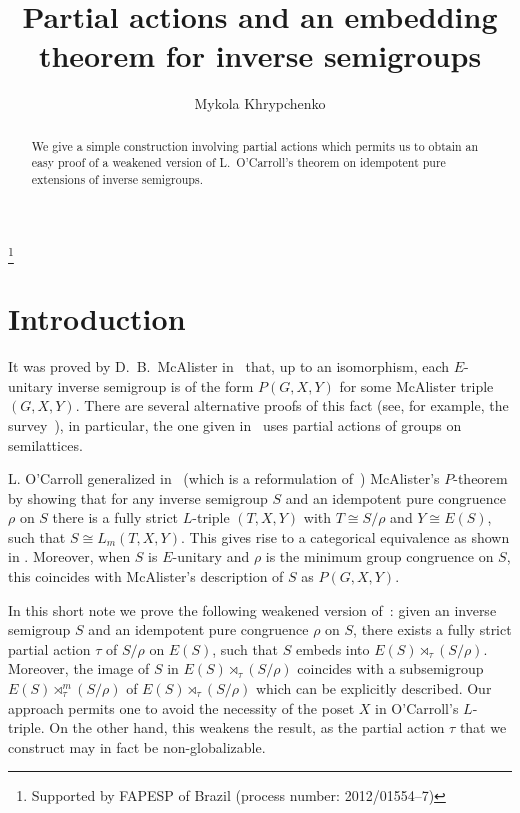 \documentclass[reqno]{amsart}
\theoremstyle{definition}
\newcommand{\0}{\theta}
\newcommand{\rt}{\rtimes}
\begin{document}
	
	\title{Partial actions and an embedding theorem for inverse semigroups}
	
	\author{Mykola Khrypchenko}
	\address{Departamento de Matem\'atica, Universidade Federal de Santa Catarina, Campus Reitor Jo\~ao David Ferreira Lima, Florian\'opolis, SC,  CEP: 88040--900, Brazil}
	
	
	\thanks{Supported by FAPESP of Brazil (process number: 2012/01554--7)}
	
	
	\begin{abstract}
     We give a simple construction involving partial actions which permits us to obtain an easy proof of a weakened version of L.~O'Carroll's theorem on idempotent pure extensions of inverse semigroups.
	\end{abstract}
	
	\maketitle
	
\section*{Introduction}

It was proved by D.~B.~McAlister in~\cite[Theorem 2.6]{McAlister74-II} that, up to an isomorphism, each $E$-unitary inverse semigroup is of the form $P(G,X,Y)$ for some McAlister triple $(G,X,Y)$. There are several alternative proofs of this fact (see, for example, the survey~\cite{Lawson-Margolis-P-th}), in particular, the one given in~\cite{KL} uses partial actions of groups on semilattices.

L. O'Carroll generalized in~\cite[Theorem 4]{O'Carroll77} (which is a reformulation of~\cite[Theorem 2.11]{O'Carroll75}) McAlister's $P$-theorem by showing that for any inverse semigroup $S$ and an idempotent pure congruence $\rho$ on $S$ there is a fully strict $L$-triple $(T,X,Y)$ with $T\cong S/\rho$ and $Y\cong E(S)$, such that $S\cong L_m(T,X,Y)$. This gives rise to a categorical equivalence as shown in \cite[Theorems~1.5, 4.1 and 4.4]{Lawson96}. Moreover, when $S$ is $E$-unitary and $\rho$ is the minimum group congruence on $S$, this coincides with McAlister's description of $S$ as $P(G,X,Y)$.

In this short note we prove the following weakened version of~\cite[Theorem~4]{O'Carroll77}: given an inverse semigroup $S$ and an idempotent pure congruence $\rho$ on $S$, there exists a fully strict partial action $\tau$ of $S/\rho$ on $E(S)$, such that $S$ embeds into $E(S)\rt_\tau(S/\rho)$. Moreover, the image of $S$ in $E(S)\rt_\tau(S/\rho)$ coincides with a subsemigroup $E(S)\rt_\tau^m(S/\rho)$ of $E(S)\rt_\tau(S/\rho)$ which can be explicitly described. Our approach permits one to avoid the necessity of the poset $X$ in O'Carroll's $L$-triple. On the other hand, this weakens the result, as the partial action $\tau$ that we construct may in fact be non-globalizable.
\end{document}
